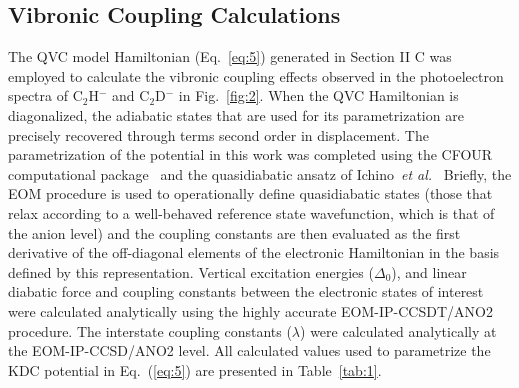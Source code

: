 \documentclass[aip,graphicx]{revtex4-1}
\begin{document}
\subsection{Vibronic Coupling Calculations}
The QVC model Hamiltonian (Eq.~\ref{eq:5}) generated in Section II C was employed to calculate the vibronic coupling effects observed in the photoelectron spectra of C$_2$H$^-$ and C$_2$D$^-$ in Fig.~\ref{fig:2}. When the QVC Hamiltonian is diagonalized, the adiabatic states that are used for its parametrization are precisely recovered through terms second order in displacement. The parametrization of the potential in this work was completed using the CFOUR computational package~\cite{dev20} and the quasidiabatic ansatz of Ichino~\emph{et al.}~\cite{ich09} Briefly, the EOM procedure is used to operationally define quasidiabatic states (those that relax according to a well-behaved reference state wavefunction, which is that of the anion level) and the coupling constants are then evaluated as the first derivative of the off-diagonal elements of the electronic Hamiltonian in the basis defined by this representation. Vertical excitation energies ($\Delta_0$), and linear diabatic force and coupling constants between the electronic states of interest were calculated analytically using the highly accurate EOM-IP-CCSDT/ANO2 procedure. The interstate coupling constants ($\lambda$) were calculated analytically at the EOM-IP-CCSD/ANO2 level. All calculated values used to parametrize the KDC potential in Eq.~(\ref{eq:5}) are presented in Table~\ref{tab:1}.
\end{document}
